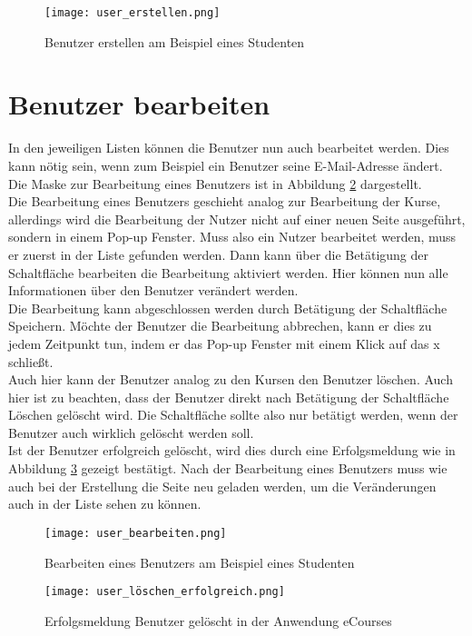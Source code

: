 \begin{figure}[h]
\centering
\texttt{[image: user\_erstellen.png]}
\caption{Benutzer erstellen am Beispiel eines Studenten}
\label{fib:benutzer_erstellen}
\end{figure}

\section{Benutzer bearbeiten}
In den jeweiligen Listen können die Benutzer nun auch bearbeitet werden. Dies kann nötig sein, wenn zum Beispiel ein Benutzer seine E-Mail-Adresse ändert. Die Maske zur Bearbeitung eines Benutzers ist in Abbildung \ref{fib:user_bearbeiten} dargestellt.\\
Die Bearbeitung eines Benutzers geschieht analog zur Bearbeitung der Kurse, allerdings wird die Bearbeitung der Nutzer nicht auf einer neuen Seite ausgeführt, sondern in einem Pop-up Fenster. Muss also ein Nutzer bearbeitet werden, muss er zuerst in der Liste gefunden werden. Dann kann über die Betätigung der Schaltfläche \glqq bearbeiten\grqq{} die Bearbeitung aktiviert werden. Hier können nun alle Informationen über den Benutzer verändert werden.\\ Die Bearbeitung kann abgeschlossen werden durch Betätigung der Schaltfläche \glqq Speichern\grqq . Möchte der Benutzer die Bearbeitung abbrechen, kann er dies zu jedem  Zeitpunkt tun, indem er das Pop-up Fenster mit einem Klick auf das \glqq x\grqq{} schließt.\\
Auch hier kann der Benutzer analog zu den Kursen den Benutzer löschen. Auch hier ist zu beachten, dass der Benutzer direkt nach Betätigung der Schaltfläche \glqq Löschen\grqq{} gelöscht wird. Die Schaltfläche sollte also nur betätigt werden, wenn der Benutzer auch wirklich gelöscht werden soll.\\
Ist der Benutzer erfolgreich gelöscht, wird dies durch eine Erfolgsmeldung wie in Abbildung \ref{fib:user_löschen} gezeigt bestätigt.
Nach der Bearbeitung eines Benutzers muss wie auch bei der Erstellung die Seite neu geladen werden, um die Veränderungen auch in der Liste sehen zu können.\\

\begin{figure}[h]
\centering
\texttt{[image: user\_bearbeiten.png]}
\caption{Bearbeiten eines Benutzers am Beispiel eines Studenten}
\label{fib:user_bearbeiten}
\end{figure}

\begin{figure}[h]
\centering
\texttt{[image: user\_löschen\_erfolgreich.png]}
\caption{Erfolgsmeldung Benutzer gelöscht in der Anwendung eCourses}
\label{fib:user_löschen}
\end{figure}
